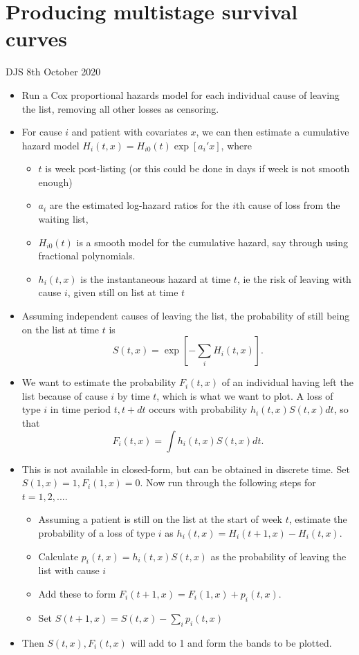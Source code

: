 \documentclass[12pt]{article}
\begin{document}
\parindent=0pt
\parskip=5pt

\section*{Producing multistage survival curves}
DJS 8th October 2020
\begin{itemize}
\item Run a Cox proportional hazards model for each individual cause of leaving the list, removing all other losses as censoring. 
\item For cause $i$ and patient with covariates $x$, we can then estimate a cumulative hazard model $H_i(t , x) = H_{i0}(t) \exp[ a_i ' x]$, where 
\begin{itemize}
\item $t$ is week post-listing (or this could be done in days if week is not smooth enough)
\item $a_i$ are the estimated log-hazard ratios for the $i$th cause of loss from the waiting list, 
\item  $H_{i0}(t)$ is a smooth model for the cumulative hazard, say through using fractional polynomials.
\item $h_i(t , x)$ is the instantaneous hazard at time $t$, ie the risk of leaving with cause $i$, given still on list at time $t$
\end{itemize}
\item Assuming independent causes of leaving the list, the probability of still being on the list at time $t$ is 
$$ S(t,x) = \exp[ - \sum_i H_i(t , x)].  $$
\item We want to estimate the probability $F_i(t,x)$ of an individual having left the list because of cause $i$ by time $t$, which is what we want to plot.   A loss of type $i$ in time period $t, t+dt$ occurs with probability $  h_i(t , x) S(t,x) dt$, so that 
$$F_i(t,x) = \int h_i(t , x) S(t,x) dt.$$
\item This is not available in closed-form, but can be obtained in discrete time.  Set $S(1,x)=1, F_i(1,x)=0$. Now run through the following steps for $t = 1,2,...$.


\begin{itemize}
\item Assuming a patient is still on the list at the start of week $t$, estimate the probability of a loss of type $i$ as $h_i(t,x) = H_i(t+1 , x) - H_i(t , x) $.  
\item Calculate $p_i(t,x) = h_i(t,x) S(t,x) $ as the probability of leaving the list with cause $i$
\item Add these to form $F_i(t+1,x) = F_i(1,x) + p_i(t,x)$.
\item Set  $S(t+1,x) = S(t,x) - \sum_i p_i(t,x) $
\end{itemize}
\item Then $S(t,x), F_i(t,x)$ will add to 1 and form the bands to be plotted.

\end{itemize}

 
\end{document}
